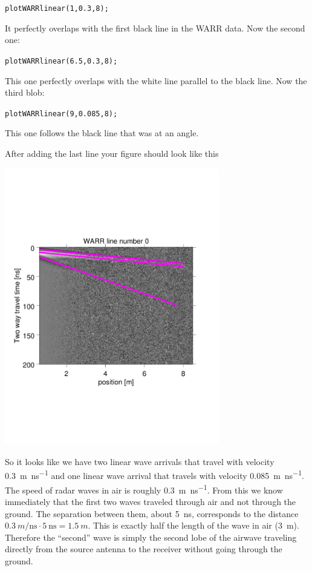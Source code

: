 \documentclass[11pt]{article}
\begin{document}
\qquad \verb#plotWARRlinear(1,0.3,8);#

It perfectly overlaps with the first black line in the WARR
data. Now the second one:

\qquad \verb#plotWARRlinear(6.5,0.3,8);#

This one perfectly overlaps with the white line parallel to the black
line. Now the third blob:

\qquad \verb#plotWARRlinear(9,0.085,8);#

This one follows the black line that was at an angle.

After adding the last line your figure should look like this
\begin{center}
  \includegraphics[width=0.7\textwidth,trim = 0.9cm 6cm 2cm
    6.5cm,clip]{figures/WARRlines}
\end{center}

So it looks like we have two linear wave arrivals that travel with velocity
\SI{0.3}{m\per\ns} and one linear wave arrival that travels with velocity
\SI{0.085}{m\per\ns}. The speed of radar waves in air is roughly
\SI{0.3}{m\per\ns}. From this we know immediately that the first two
waves traveled through air and not through the ground. The separation
between them, about \SI{5}{\ns}, corresponds to the distance
$\SI{0.3}{m\per\ns} \cdot \SI{5}{\ns} = \SI{1.5}{m}$. This is exactly
half the length of the wave in air (\SI{3}{m}). Therefore the ``second''
wave is simply the second lobe of the airwave traveling directly from
the source antenna to the receiver without going through the ground.
\end{document}
